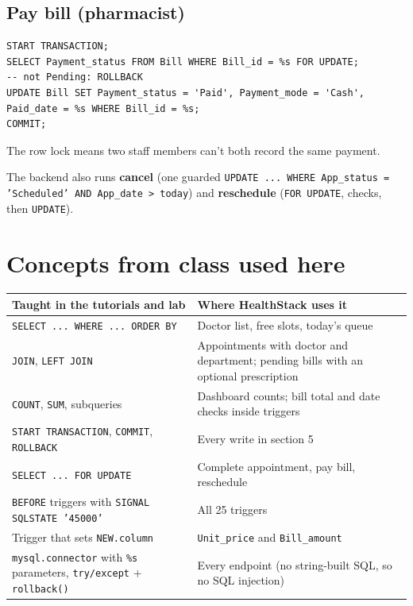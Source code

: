 \documentclass[11pt,a4paper]{article}
\newcommand{\code}[1]{\texttt{#1}}
\begin{document}
\subsection*{Pay bill (pharmacist)}
\begin{lstlisting}[style=sql]
START TRANSACTION;
SELECT Payment_status FROM Bill WHERE Bill_id = %s FOR UPDATE;                  -- not Pending: ROLLBACK
UPDATE Bill SET Payment_status = 'Paid', Payment_mode = 'Cash', Paid_date = %s WHERE Bill_id = %s;
COMMIT;
\end{lstlisting}
The row lock means two staff members can't both record the same payment.

The backend also runs \textbf{cancel} (one guarded \code{UPDATE ... WHERE App\_status = 'Scheduled' AND App\_date > today}) and \textbf{reschedule} (\code{FOR UPDATE}, checks, then \code{UPDATE}).

\section{Concepts from class used here}

\begin{center}
\small
\begin{tabularx}{\textwidth}{>{\raggedright\arraybackslash}p{6.4cm} L}
\toprule
\textbf{Taught in the tutorials and lab} & \textbf{Where HealthStack uses it} \\
\midrule
\code{SELECT ... WHERE ... ORDER BY} & Doctor list, free slots, today's queue \\
\code{JOIN}, \code{LEFT JOIN} & Appointments with doctor and department; pending bills with an optional prescription \\
\code{COUNT}, \code{SUM}, subqueries & Dashboard counts; bill total and date checks inside triggers \\
\code{START TRANSACTION}, \code{COMMIT}, \code{ROLLBACK} & Every write in section 5 \\
\code{SELECT ... FOR UPDATE} & Complete appointment, pay bill, reschedule \\
\code{BEFORE} triggers with \code{SIGNAL SQLSTATE '45000'} & All 25 triggers \\
Trigger that sets \code{NEW.column} & \code{Unit\_price} and \code{Bill\_amount} \\
\code{mysql.connector} with \code{\%s} parameters, \code{try/except} + \code{rollback()} & Every endpoint (no string-built SQL, so no SQL injection) \\
\bottomrule
\end{tabularx}
\end{center}
\end{document}
